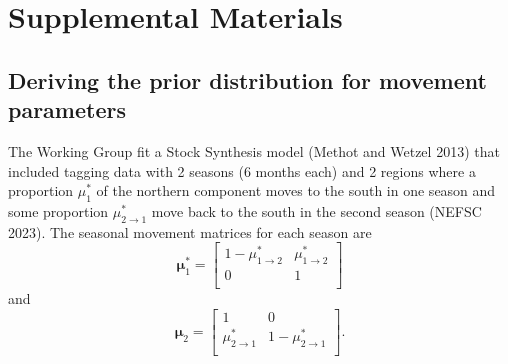 \documentclass[
]{article}
\begin{document}
\setcounter{table}{0}
\renewcommand\thetable{A\arabic{table}}


\pagebreak

\hypertarget{supplemental-materials}{%
\section*{Supplemental Materials}\label{supplemental-materials}}

\hypertarget{deriving-the-prior-distribution-for-movement-parameters}{%
\subsection*{Deriving the prior distribution for movement
parameters}\label{deriving-the-prior-distribution-for-movement-parameters}}

The Working Group fit a Stock Synthesis model (Methot and Wetzel 2013)
that included tagging data with 2 seasons (6 months each) and 2 regions
where a proportion \(\mu^*_1\) of the northern component moves to the
south in one season and some proportion \(\mu^*_{2\rightarrow 1}\) move
back to the south in the second season (NEFSC 2023). The seasonal
movement matrices for each season are \begin{equation*}
\boldsymbol{\mu}^*_{1} = 
  \begin{bmatrix}
     1-\mu^*_{1\rightarrow 2} & \mu^*_{1\rightarrow 2} \\
     0 & 1 \\
  \end{bmatrix}
\end{equation*} and \begin{equation*}
\boldsymbol{\mu}_{2} = 
  \begin{bmatrix}
     1 &  0 \\
     \mu^*_{2\rightarrow 1} & 1-\mu^*_{2\rightarrow 1} \\
  \end{bmatrix}.
\end{equation*}
\end{document}
